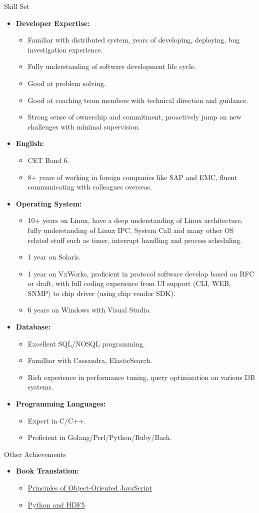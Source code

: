 \documentclass[11pt,oneside]{article}
\newenvironment{ressection}[1]{
	\vspace{4pt}
	{\selectfont\Large#1}
	\begin{itemize}
	\vspace{3pt}
}{
	\end{itemize}
}
\newcommand{\resitem}[1]{
	\vspace{-4pt}
	\item \begin{flushleft} #1 \end{flushleft}
}
\newcommand{\ressubitem}[1]{
	\vspace{-1pt}
	\item \begin{flushleft} #1 \end{flushleft}
}
\newenvironment{reslist}[1]{
	\resitem{\textbf{#1}}
	\vspace{-5pt}
	\begin{itemize}
}{
	\end{itemize}
}
\begin{document}
\begin{ressection}{Skill Set}

	\begin{reslist}{Developer Expertise:}
		\ressubitem{Familiar with distributed system, years of developing, deploying, bug investigation experience.}
		\ressubitem{Fully understanding of software development life cycle.}
		\ressubitem{Good at problem solving.}
		\ressubitem{Good at coaching team members with technical direction and guidance.}
		\ressubitem{Strong sense of ownership and commitment, proactively jump on new challenges with minimal supervision.}
	\end{reslist}

	\begin{reslist}{English:}
		\ressubitem{CET Band 6.}
		\ressubitem{8+ years of working in foreign companies like SAP and EMC, fluent communicating with colleagues overseas.}
	\end{reslist}

	\begin{reslist}{Operating System:}
		\ressubitem{10+ years on Linux, have a deep understanding of Linux architecture,
                    fully understanding of Linux IPC, System Call and
					many other OS related stuff such as timer, interrupt handling and process scheduling.}
		\ressubitem{1 year on Solaris.}
		\ressubitem{1 year on VxWorks, proficient in protocol software develop based on RFC or draft, with
					full coding experience from UI support (CLI, WEB, SNMP) to chip driver (using chip
					vendor SDK).}
		\ressubitem{6 years on Windows with Visual Studio.}
	\end{reslist}

	\begin{reslist}{Database:}
		\ressubitem{Excellent SQL/NOSQL programming.}
		\ressubitem{Familliar with Cassandra, ElasticSearch.}
		\ressubitem{Rich experience in performance tuning, query optimization on various DB systems.}
	\end{reslist}

	\begin{reslist}{Programming Languages:}
		\ressubitem{Expert in C/C++.}
		\ressubitem{Proficient in Golang/Perl/Python/Ruby/Bash.}
	\end{reslist}

\end{ressection}

\begin{ressection}{Other Achievements}

	\begin{reslist}{Book Translation:}
        \ressubitem{\href{http://shop.oreilly.com/product/9781593275402.do}{Principles of Object-Oriented JavaScript}}
        \ressubitem{\href{http://shop.oreilly.com/product/0636920030249.do}{Python and HDF5}}
	\end{reslist}

\end{ressection}
\end{document}
